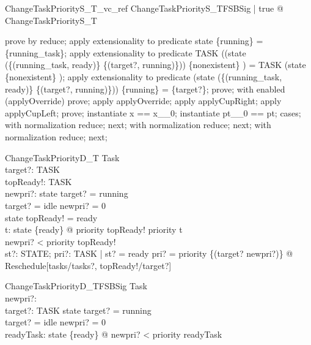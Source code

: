 \begin{theorem}{ChangeTaskPriorityS\_T\_vc\_ref}
\forall  ChangeTaskPriorityS\_TFSBSig | true @ \pre  ChangeTaskPriorityS\_T
\end{theorem}

\begin{zproof}
prove by reduce;
apply extensionality to predicate state \inv  \limg  \{running\} \rimg  = \{running\_task\};
apply extensionality to predicate TASK \setminus  ((state \oplus  (\{(running\_task, ready)\} \cup  \{(target?, running)\})) \inv  \limg  \{nonexistent\} \rimg ) = TASK \setminus  (state \inv  \limg  \{nonexistent\} \rimg );
apply extensionality to predicate (state \oplus  (\{(running\_task, ready)\} \cup  \{(target?, running)\})) \inv  \limg  \{running\} \rimg  = \{target?\};
prove;
with enabled (applyOverride) prove;
apply applyOverride;
apply applyCupRight;
apply applyCupLeft;
prove;
instantiate x == x\_\_0;
instantiate pt\_\_0 == pt;
cases;
with normalization reduce;
next;
with normalization reduce;
next;
with normalization reduce;
next;
\end{zproof}

\begin{schema}{ChangeTaskPriorityD\_T}
  \Delta Task\\
  target?: TASK\\
  topReady!: TASK\\
  newpri?: \nat 
\where
  state target? = running\\
  target? = idle \implies  newpri? = 0\\
  state topReady! = ready\\
  \forall  t: state \inv  \limg  \{ready\} \rimg  @ priority topReady! \geq  priority t\\
  newpri? < priority topReady!\\
  \exists  st?: STATE; pri?: TASK \fun  \nat  | st? = ready \land  pri? = priority \oplus  \{(target? \mapsto  newpri?)\} @ Reschedule[tasks/tasks?, topReady!/target?]
\end{schema}

\begin{schema}{ChangeTaskPriorityD\_TFSBSig}
  Task\\
  newpri?: \nat \\
  target?: TASK
\where
  state target? = running\\
  target? = idle \implies  newpri? = 0\\
  \exists  readyTask: state \inv  \limg  \{ready\} \rimg  @ newpri? < priority readyTask
\end{schema}

